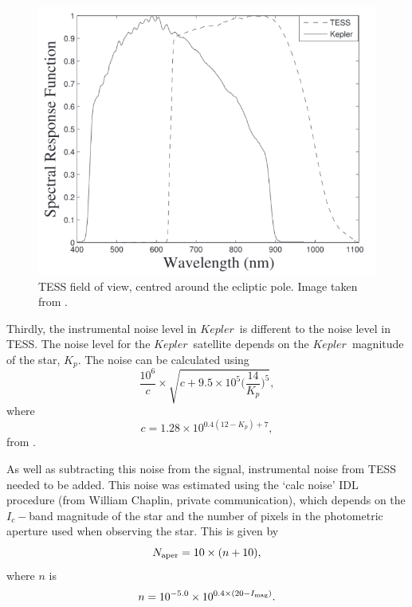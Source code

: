 \documentclass[a4paper,fleqn,usenatbib,useAMS]{mnras}
\newcommand{\kep}{\ensuremath{Kepler}}
\begin{document}
\begin{figure}
	\centering
	\includegraphics[scale=0.4]{bandpass.png}
	\caption{TESS field of view, centred around the ecliptic pole. Image taken from \citet{placek_combining_2016}.}	
	\label{bandpass}
\end{figure} 

Thirdly, the instrumental noise level in \kep \ is different to the noise level in TESS. The noise level for the \kep \ satellite depends on the \kep \ magnitude of the star, $K_{p}$. The noise can be calculated using
\begin{equation}
\frac{10^{6}}{c} \times \sqrt{c+9.5 \times 10^{5}\Bigg(\frac{14}{K_{p}}\Bigg)^{5}} ,
\end{equation}
where
\begin{equation}
c = 1.28 \times 10^{0.4(12-K_{p})+7} ,
\end{equation}
from \citet{chaplin_predicting_2011}.

As well as subtracting this noise from the signal, instrumental noise from TESS needed to be added. This noise was estimated using the `calc noise' IDL procedure (from William Chaplin, private communication), which depends on the $I_{c}-$band magnitude of the star and the number of pixels in the photometric aperture used when observing the star. This is given by
\begin{equation}
N_{\rm aper} = 10 \times (n+10) , 
\end{equation}
where $n$ is
\begin{equation}
n = 10^{-5.0} \times 10^{ 0.4 \times (20-I_{\rm mag})} .
\end{equation}
\end{document}
